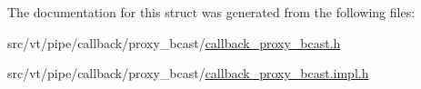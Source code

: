 The documentation for this struct was generated from the following files\+:\begin{DoxyCompactItemize}
\item 
src/vt/pipe/callback/proxy\+\_\+bcast/\hyperlink{callback__proxy__bcast_8h}{callback\+\_\+proxy\+\_\+bcast.\+h}\item 
src/vt/pipe/callback/proxy\+\_\+bcast/\hyperlink{callback__proxy__bcast_8impl_8h}{callback\+\_\+proxy\+\_\+bcast.\+impl.\+h}\end{DoxyCompactItemize}
